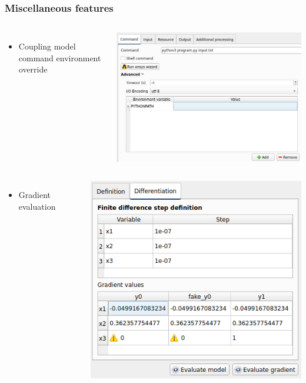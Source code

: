 \documentclass[aspectratio=169]{beamer}
\begin{document}
\begin{frame}
  \frametitle{Miscellaneous features}
  \begin{columns}
    \begin{itemize}
    \item Coupling model command environment override
    \end{itemize}
    \begin{center}
      \includegraphics[height=0.3\textheight]{figures/couplingEnv.png}
    \end{center}
  \end{columns}

  \begin{columns}
    \begin{itemize}
    \item Gradient evaluation
    \end{itemize}
    \begin{center}
      \includegraphics[height=0.3\textheight]{figures/gradient.png}
    \end{center}
  \end{columns}
\end{frame}
\end{document}
